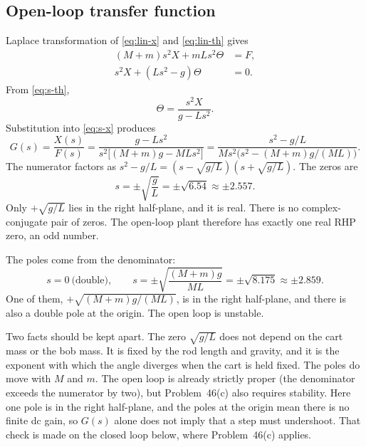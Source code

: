 \documentclass[12pt,a4paper]{article}
\begin{document}
\subsection{Open-loop transfer function}

Laplace transformation of \eqref{eq:lin-x} and \eqref{eq:lin-th} gives
\begin{align}
  (M+m)s^2X+mLs^2\Theta&=F,
  \label{eq:s-x}\\
  s^2X+(Ls^2-g)\Theta&=0.
  \label{eq:s-th}
\end{align}
From \eqref{eq:s-th},
\[
  \Theta=\frac{s^2X}{g-Ls^2}.
\]
Substitution into \eqref{eq:s-x} produces
\begin{equation}
  G(s)=\frac{X(s)}{F(s)}
  =\frac{g-Ls^2}{s^2\bigl[(M+m)g-MLs^2\bigr]}
  =\frac{s^2-g/L}{Ms^2\bigl(s^2-(M+m)g/(ML)\bigr)}.
  \label{eq:G}
\end{equation}
The numerator factors as \(s^2-g/L=(s-\sqrt{g/L})(s+\sqrt{g/L})\).
The zeros are
\begin{equation}
  s=\pm\sqrt{\frac{g}{L}}=\pm\sqrt{6.54}\approx\pm 2.557.
  \label{eq:zeros}
\end{equation}
Only \(+\sqrt{g/L}\) lies in the right half-plane, and it is real.
There is no complex-conjugate pair of zeros.
The open-loop plant therefore has exactly one real RHP zero, an odd number.

The poles come from the denominator:
\begin{equation}
  s=0\ \text{(double)},\qquad
  s=\pm\sqrt{\frac{(M+m)g}{ML}}
   =\pm\sqrt{8.175}\approx\pm 2.859.
  \label{eq:ol-poles}
\end{equation}
One of them, \(+\sqrt{(M+m)g/(ML)}\), is in the right half-plane, and there is also a double pole at the origin.
The open loop is unstable.

Two facts should be kept apart.
The zero \(\sqrt{g/L}\) does not depend on the cart mass or the bob mass. It is fixed by the rod length and gravity, and it is the exponent with which the angle diverges when the cart is held fixed.
The poles do move with \(M\) and \(m\).
The open loop is already strictly proper (the denominator exceeds the numerator by two), but Problem~46(c) also requires stability.
Here one pole is in the right half-plane, and the poles at the origin mean there is no finite dc gain, so \(G(s)\) alone does not imply that a step must undershoot.
That check is made on the closed loop below, where Problem~46(c) applies.
\end{document}
